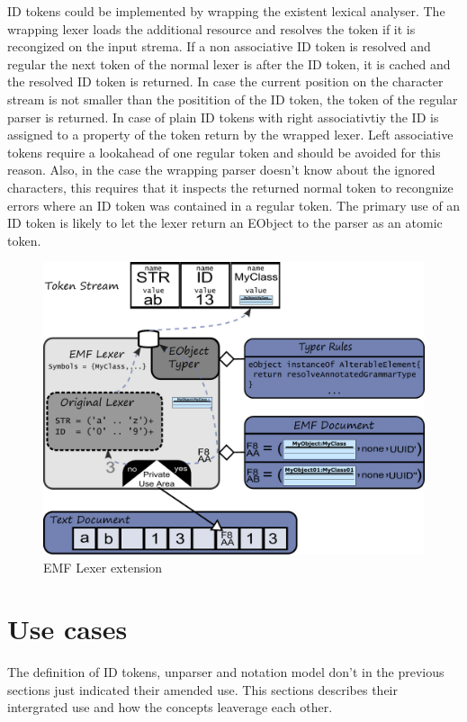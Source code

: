 ID tokens could be implemented by wrapping the existent lexical analyser. The wrapping lexer loads the additional resource and resolves the token if it is recongized on the input strema. If a non associative ID token is resolved and regular the next token of the normal lexer is after the ID token, it is cached and the resolved ID token is returned. In case the current position on the character stream is not smaller than the positition of the ID token, the token of the regular parser is returned. In case of plain ID tokens with right associativtiy the ID is assigned to a property of the token return by the wrapped lexer. Left associative tokens require a lookahead of one regular token and should be avoided for this reason. Also, in the case the wrapping parser doesn't know about the ignored characters, this requires that it inspects the returned normal token to recongnize errors where an ID token was contained in a regular token. The primary use of an ID token is likely to let the lexer return an EObject to the parser as an atomic token.

\begin{figure}
\centering
\includegraphics[scale=0.55]{gfx/ex/Lexer} 
\caption{EMF Lexer extension}
\end{figure}


\section{Use cases}
The definition of ID tokens, unparser and notation model don't in the previous sections just indicated their amended use. This sections describes their intergrated use and how the concepts leaverage each other. 

